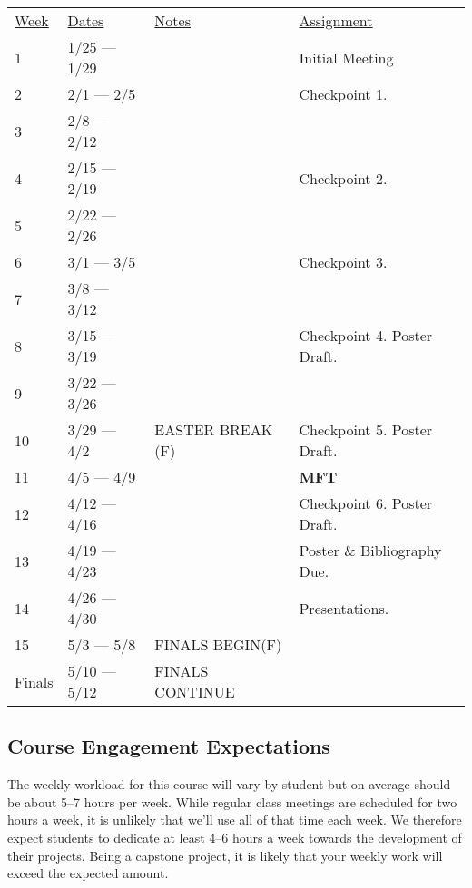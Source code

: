 \documentclass[]{article}
\begin{document}
\begin{center}
\begin{tabular}{llll}
\underline{Week} & \underline{Dates} & \underline{Notes} & \underline{Assignment}\\
1 & 1/25 --- 1/29 & & Initial Meeting  \\
2 & 2/1 --- 2/5 &  & Checkpoint 1. \\
3 & 2/8 --- 2/12 & &  \\
4 & 2/15 --- 2/19 & & Checkpoint 2. \\
5 & 2/22 --- 2/26 & &\\
6 & 3/1 --- 3/5 & & Checkpoint 3. \\
7 & 3/8 --- 3/12 & &  \\
8 & 3/15 --- 3/19 &    & Checkpoint 4. Poster Draft. \\
9 & 3/22 --- 3/26 &  & \\
10 & 3/29 --- 4/2 & EASTER BREAK (F) & Checkpoint 5. Poster Draft. \\
11 & 4/5 --- 4/9 & &  \textbf{MFT} \\
12 & 4/12 --- 4/16 & & Checkpoint 6. Poster Draft.\\
13 & 4/19 --- 4/23 & &  Poster \& Bibliography Due.  \\
14 & 4/26 --- 4/30 &  & Presentations. \\
15 & 5/3 --- 5/8 & FINALS BEGIN(F) &   \\
Finals & 5/10 --- 5/12 & FINALS CONTINUE & \\
\end{tabular}
\end{center}


\subsection{Course Engagement Expectations}

The weekly workload for this course will vary by student but on average should be about 5--7 hours per week.  While regular class meetings are scheduled for two hours a week, it is unlikely that we'll use all of that time each week.  We therefore expect students to dedicate at least 4--6 hours a week towards the development of their projects.  Being a capstone project, it is likely that your weekly work will exceed the expected amount.
\end{document}
